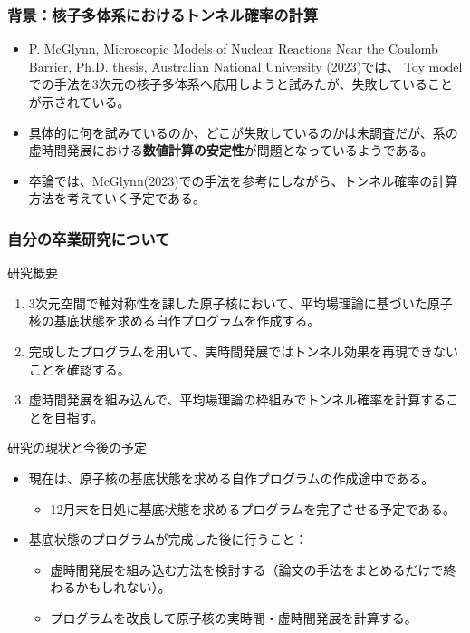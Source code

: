 \documentclass[11pt,aspectratio=169,xcolor=dvipsnames,table,dvipdfmx]{beamer}
\theoremstyle{definition}
\begin{document}
\begin{frame}
  \frametitle{背景：核子多体系におけるトンネル確率の計算}
  \begin{itemize}
    \item P. McGlynn, Microscopic Models of Nuclear Reactions Near the Coulomb Barrier, Ph.D. thesis, Australian National University (2023)では、
    Toy modelでの手法を3次元の核子多体系へ応用しようと試みたが、失敗していることが示されている。
    \item 具体的に何を試みているのか、どこが失敗しているのかは未調査だが、系の虚時間発展における\textbf{数値計算の安定性}が問題となっているようである。
    \item 卒論では、McGlynn(2023)での手法を参考にしながら、トンネル確率の計算方法を考えていく予定である。
  \end{itemize}
\end{frame}


\begin{frame}
  \frametitle{自分の卒業研究について}
  \begin{block}{研究概要}
    \begin{enumerate}
      \item 3次元空間で軸対称性を課した原子核において、平均場理論に基づいた原子核の基底状態を求める自作プログラムを作成する。
      \item 完成したプログラムを用いて、実時間発展ではトンネル効果を再現できないことを確認する。
      \item 虚時間発展を組み込んで、平均場理論の枠組みでトンネル確率を計算することを目指す。
    \end{enumerate}
  \end{block}
  \begin{exampleblock}{研究の現状と今後の予定}
    \begin{itemize}
      \item 現在は、原子核の基底状態を求める自作プログラムの作成途中である。
      \begin{itemize}
        \item 12月末を目処に基底状態を求めるプログラムを完了させる予定である。
      \end{itemize}
      \item 基底状態のプログラムが完成した後に行うこと：
      \begin{itemize}
        \item 虚時間発展を組み込む方法を検討する（論文の手法をまとめるだけで終わるかもしれない）。
        \item プログラムを改良して原子核の実時間・虚時間発展を計算する。
      \end{itemize}
    \end{itemize}
  \end{exampleblock}

\end{frame}
\end{document}
